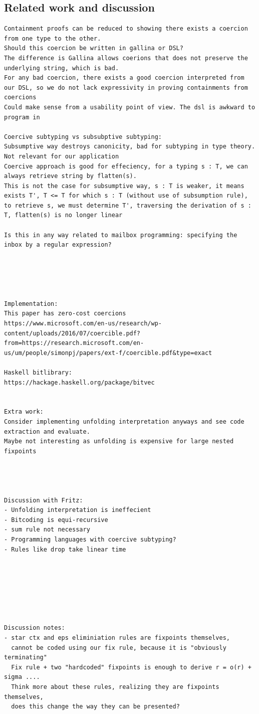 \documentclass[a4paper,UKenglish,cleveref, autoref, thm-restate]{lipics-v2021}
\begin{document}
\subsection{Related work and discussion}
\begin{verbatim}
Containment proofs can be reduced to showing there exists a coercion from one type to the other.
Should this coercion be written in gallina or DSL?
The difference is Gallina allows coerions that does not preserve the underlying string, which is bad.
For any bad coercion, there exists a good coercion interpreted from our DSL, so we do not lack expressivity in proving containments from coercions
Could make sense from a usability point of view. The dsl is awkward to program in

Coercive subtyping vs subsubptive subtyping:
Subsumptive way destroys canonicity, bad for subtyping in type theory. Not relevant for our application
Coercive approach is good for effeciency, for a typing s : T, we can always retrieve string by flatten(s). 
This is not the case for subsumptive way, s : T is weaker, it means exists T', T <= T for which s : T (without use of subsumption rule), to retrieve s, we must determine T', traversing the derivation of s : T, flatten(s) is no longer linear

Is this in any way related to mailbox programming: specifying the inbox by a regular expression?





Implementation:
This paper has zero-cost coercions
https://www.microsoft.com/en-us/research/wp-content/uploads/2016/07/coercible.pdf?from=https://research.microsoft.com/en-us/um/people/simonpj/papers/ext-f/coercible.pdf&type=exact

Haskell bitlibrary:
https://hackage.haskell.org/package/bitvec


Extra work:
Consider implementing unfolding interpretation anyways and see code extraction and evaluate.
Maybe not interesting as unfolding is expensive for large nested fixpoints




Discussion with Fritz:
- Unfolding interpretation is ineffecient
- Bitcoding is equi-recursive
- sum rule not necessary
- Programming languages with coercive subtyping?
- Rules like drop take linear time







Discussion notes:
- star ctx and eps eliminiation rules are fixpoints themselves,
  cannot be coded using our fix rule, because it is "obviously terminating"
  Fix rule + two "hardcoded" fixpoints is enough to derive r = o(r) + sigma ....
  Think more about these rules, realizing they are fixpoints themselves,
  does this change the way they can be presented?


\end{verbatim}
\end{document}

